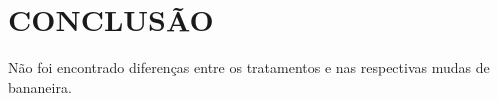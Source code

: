\chapter{CONCLUSÃO}
Não foi encontrado diferenças entre os tratamentos e nas respectivas mudas de bananeira.